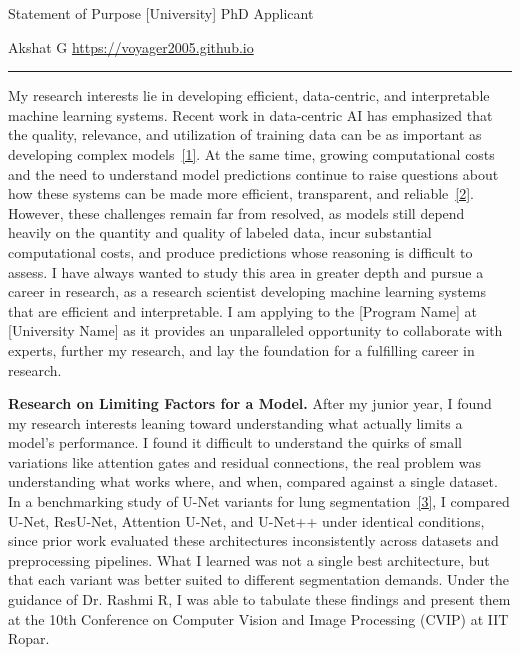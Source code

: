 \documentclass[11pt]{article}
\begin{document}
{\small Statement of Purpose \hfill [University] PhD Applicant \par}
{\small Akshat G \hfill \url{https://voyager2005.github.io} \par}
\vspace{4pt}
\hrule
\vspace{8pt}

My research interests lie in developing efficient, data-centric, and interpretable machine learning systems. Recent work in data-centric AI has emphasized that the quality, relevance, and utilization of training data can be as important as developing complex models~\hyperref[ref1]{[1]}. At the same time, growing computational costs and the need to understand model predictions continue to raise questions about how these systems can be made more efficient, transparent, and reliable~\hyperref[ref2]{[2]}. However, these challenges remain far from resolved, as models still depend heavily on the quantity and quality of labeled data, incur substantial computational costs, and produce predictions whose reasoning is difficult to assess. I have always wanted to study this area in greater depth and pursue a career in research, as a research scientist developing machine learning systems that are efficient and interpretable. I am applying to the [Program Name] at [University Name] as it provides an unparalleled opportunity to collaborate with experts, further my research, and lay the foundation for a fulfilling career in research.

\vspace{8pt}

\textbf{Research on Limiting Factors for a Model.} After my junior year, I found my research interests leaning toward understanding what actually limits a model's performance. I found it difficult to understand the quirks of small variations like attention gates and residual connections, the real problem was understanding what works where, and when, compared against a single dataset. In a benchmarking study of U-Net variants for lung segmentation~\hyperref[ref3]{[3]}, I compared U-Net, ResU-Net, Attention U-Net, and U-Net++ under identical conditions, since prior work evaluated these architectures inconsistently across datasets and preprocessing pipelines. What I learned was not a single best architecture, but that each variant was better suited to different segmentation demands. Under the guidance of Dr. Rashmi R, I was able to tabulate these findings and present them at the 10th Conference on Computer Vision and Image Processing (CVIP) at IIT Ropar.
\end{document}
